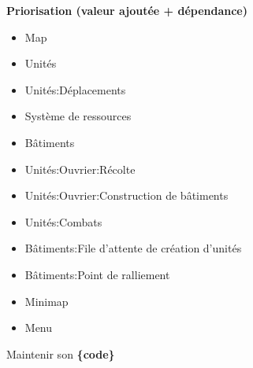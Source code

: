 \documentclass[12pt]{beamer}
\begin{document}
\begin{frame}
    \vspace{1cm}
    {\large \textbf{Priorisation (valeur ajoutée + dépendance)}} \\
    \begin{itemize}
        \item Map \\
        \item Unités \\
        \item Unités:Déplacements \\
        \item Système de ressources \\
        \item Bâtiments \\
        \item Unités:Ouvrier:Récolte \\
        \item Unités:Ouvrier:Construction de bâtiments \\
        \item Unités:Combats \\
        \item Bâtiments:File d'attente de création d'unités \\
        \item Bâtiments:Point de ralliement \\
        \item Minimap \\
        \item Menu \\
    \end{itemize}
\end{frame}


\begingroup
{}
\begin{frame}
    \begin{center}
        \vspace{1cm}
        {\Large\color{background} Maintenir son \textbf{\{code\}}}
    \end{center}
\end{frame}
\endgroup
\end{document}
